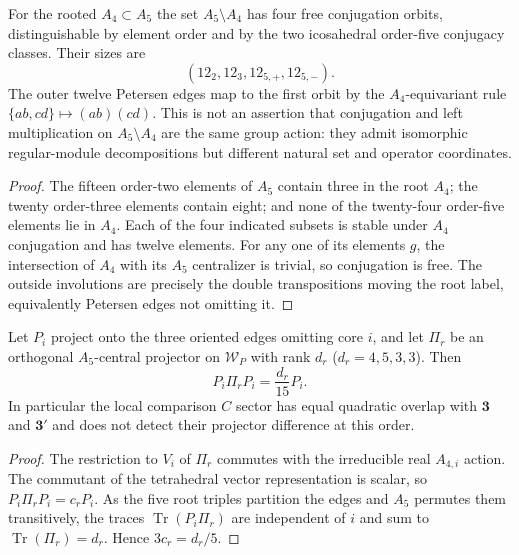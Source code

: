 \documentclass[11pt,a4paper]{article}
\begin{document}
\begin{proposition}
\label{p5d:prop:v321-four-complement-sheets}
For the rooted $A_4\subset A_5$ the set $A_5\setminus A_4$ has four free
conjugation orbits, distinguishable by element order and by the two
icosahedral order-five conjugacy classes. Their sizes are
\[
 (12_{2},12_{3},12_{5,+},12_{5,-}).
\]
The outer twelve Petersen edges map to the first orbit by the
$A_4$-equivariant rule
$\{ab,cd\}\mapsto(ab)(cd)$. This is not an assertion that conjugation
and left multiplication on $A_5\setminus A_4$ are the same group action:
they admit isomorphic regular-module decompositions but different natural
set and operator coordinates.
\end{proposition}
\begin{proof}
The fifteen order-two elements of $A_5$ contain three in the root $A_4$;
the twenty order-three elements contain eight; and none of the twenty-four
order-five elements lie in $A_4$. Each of the four indicated subsets is
stable under $A_4$ conjugation and has twelve elements. For any one of its
elements $g$, the intersection of $A_4$ with its $A_5$ centralizer is
trivial, so conjugation is free. The outside involutions are precisely
the double transpositions moving the root label, equivalently Petersen
edges not omitting it.
\end{proof}

\begin{theorem}
\label{p5d:thm:v321-sector-compression-certificate}
Let $P_i$ project onto the three oriented edges omitting core $i$, and let
$\Pi_r$ be an orthogonal $A_5$-central projector on $\mathscr W_P$ with
rank $d_r$ ($d_r=4,5,3,3$). Then
\[
 \boxed{P_i\Pi_rP_i=\frac{d_r}{15}P_i.}
\]
In particular the local comparison $C$ sector has equal quadratic overlap
with $\mathbf3$ and $\mathbf3'$ and does not detect their projector
difference at this order.
\end{theorem}
\begin{proof}
The restriction to $V_i$ of $\Pi_r$ commutes with the irreducible real
$A_{4,i}$ action. The commutant of the tetrahedral vector representation
is scalar, so $P_i\Pi_rP_i=c_rP_i$. As the five root triples partition the
edges and $A_5$ permutes them transitively, the traces
$\operatorname{Tr}(P_i\Pi_r)$ are independent of $i$ and sum to
$\operatorname{Tr}(\Pi_r)=d_r$. Hence $3c_r=d_r/5$.
\end{proof}
\end{document}
